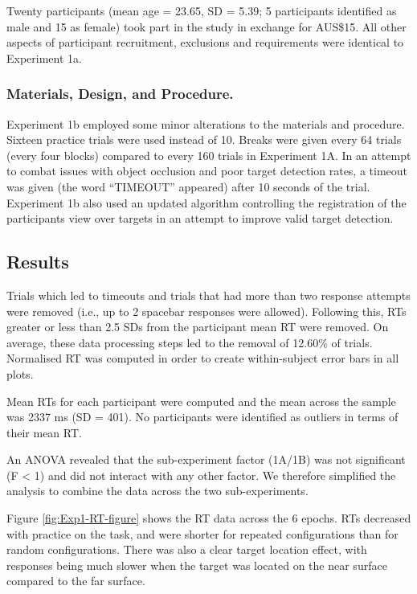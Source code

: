\documentclass[
  english,
  man,floatsintext]{apa7}
\begin{document}
Twenty participants (mean age = 23.65, SD = 5.39; 5 participants identified as male and 15 as female) took part in the study in exchange for AUS\$15. All other aspects of participant recruitment, exclusions and requirements were identical to Experiment 1a.

\hypertarget{materials-design-and-procedure.}{%
\subsubsection{Materials, Design, and Procedure.}\label{materials-design-and-procedure.}}

Experiment 1b employed some minor alterations to the materials and procedure. Sixteen practice trials were used instead of 10. Breaks were given every 64 trials (every four blocks) compared to every 160 trials in Experiment 1A. In an attempt to combat issues with object occlusion and poor target detection rates, a timeout was given (the word ``TIMEOUT'' appeared) after 10 seconds of the trial. Experiment 1b also used an updated algorithm controlling the registration of the participants view over targets in an attempt to improve valid target detection.

\hypertarget{results}{%
\subsection{Results}\label{results}}

Trials which led to timeouts and trials that had more than two response attempts were removed (i.e., up to 2 spacebar responses were allowed). Following this, RTs greater or less than 2.5 SDs from the participant mean RT were removed. On average, these data processing steps led to the removal of 12.60\% of trials. Normalised RT was computed in order to create within-subject error bars in all plots.

Mean RTs for each participant were computed and the mean across the sample was 2337 ms (SD = 401). No participants were identified as outliers in terms of their mean RT.

An ANOVA revealed that the sub-experiment factor (1A/1B) was not significant (F \textless{} 1) and did not interact with any other factor. We therefore simplified the analysis to combine the data across the two sub-experiments.

Figure \ref{fig:Exp1-RT-figure} shows the RT data across the 6 epochs. RTs decreased with practice on the task, and were shorter for repeated configurations than for random configurations. There was also a clear target location effect, with responses being much slower when the target was located on the near surface compared to the far surface.
\end{document}

